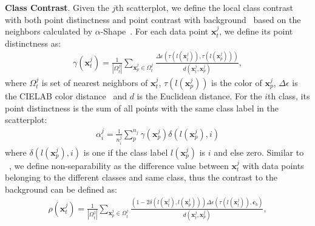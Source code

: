 \noindent\textbf{Class Contrast}.
Given the $j$th scatterplot, we define the local class contrast with both point distinctness and point contrast with background~\cite{Wang2018} based on the neighbors calculated by $\alpha$-Shape~\cite{Lu21}.  For each data point $\mathbf{x}^j_t$, we define its point distinctness as:
\begin{align}\label{eq:pd}
 \gamma (\mathbf{x}^j_t)=\frac{1}{|\Omega^j_t|} \sum_{\mathbf{x}^j_p \in \Omega^j_t}  \frac{\Delta\epsilon(\tau(l(\mathbf{x}^j_t)),\tau(l(\mathbf{x}^j_p)))}{d(\mathbf{x}^j_t,\mathbf{x}^j_p)} ,
\end{align}
where $\Omega^j_t$ is set of nearest neighbors of $\mathbf{x}^j_t$, $\tau(l(\mathbf{x}^j_p))$ is the color of $\mathbf{x}^j_p$, $\Delta \epsilon$ is the CIELAB color distance~\cite{sharma2005ciede2000} and $d$ is the Euclidean distance.
For the $i$th class, its point distinctness is the sum of all points with the same class label in the scatterplot:
\begin{align}\label{eq:pdc}
 \alpha^j_i = \frac{1}{n^j_i}\sum^{n_j}_{p}\gamma(\mathbf{x}^j_p) \delta(l(\mathbf{x}^j_p),i)
\end{align}
where $\delta(l(\mathbf{x}^j_p),i)$ is one if the class label $l(\mathbf{x}^j_p)$ is $i$ and else zero.
%
%
Similar to ~\cite{Wang2018}, we define non-separability as the difference value between $\mathbf{x}^j_t$ with data points belonging to the different classes and same class, thus the contrast to the background can be defined as:
\begin{align}\label{eq:ctb}
 \rho (\mathbf{x}^j_t)=\frac{1}{|\Omega^j_t|} \sum_{\mathbf{x}^j_p \in \Omega^j_t}  \frac{(1-2\delta(l(\mathbf{x}^j_t),l(\mathbf{x}^j_p)))\Delta\epsilon(\tau(l(\mathbf{x}^j_t)),\mathbf{c}_b)}{d(\mathbf{x}^j_t,\mathbf{x}^j_p)} ,
\end{align}
